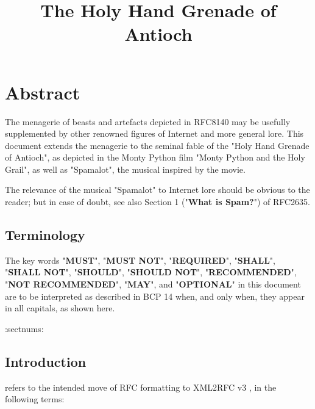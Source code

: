 \documentclass{metanorma}
\title{The Holy Hand Grenade of Antioch}
\begin{document}
\maketitle

\tableofcontents


\section{Abstract}

The menagerie of beasts and artefacts depicted in RFC8140
may be usefully supplemented by other renowned figures of
Internet and more general lore. This document extends the
menagerie to the seminal fable of the
"Holy Hand Grenade of Antioch", as depicted in the
Monty Python film "Monty Python and the Holy Grail",
as well as "Spamalot", the musical inspired by the movie.

\begin{note}
  The relevance of the musical "Spamalot" to Internet lore should be
  obvious to the reader; but in case of doubt, see also
  Section 1 ("\textbf{What is Spam?}") of RFC2635.
\end{note}



\subsection{Terminology}

The key words "\textbf{MUST}", "\textbf{MUST NOT}", "\textbf{REQUIRED}", "\textbf{SHALL}",
"\textbf{SHALL NOT}", "\textbf{SHOULD}", "\textbf{SHOULD NOT}", "\textbf{RECOMMENDED}",
"\textbf{NOT RECOMMENDED}", "\textbf{MAY}", and "\textbf{OPTIONAL}" in this document
are to be interpreted as described in BCP 14  
when, and only when, they appear in all capitals, as shown here.

:sectnums:
\subsection{Introduction}

 refers to the intended move of RFC formatting to
XML2RFC v3 , in the following terms:
\end{document}
